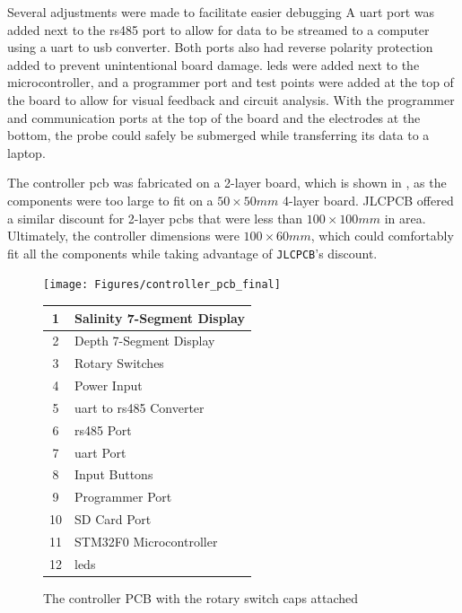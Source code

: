 Several adjustments were made to facilitate easier debugging
A \gls{uart} port was added next to the \gls{rs485} port to allow for data to be streamed to a computer using a \gls{uart} to \gls{usb} converter.
Both ports also had reverse polarity protection added to prevent unintentional board damage. 
\glspl{led} were added next to the microcontroller, and a programmer port and test points were added at the top of the board to allow for visual feedback and circuit analysis.
With the programmer and communication ports at the top of the board and the electrodes at the bottom, the probe could safely be submerged while transferring its data to a laptop.

The controller \gls{pcb} was fabricated on a 2-layer board, which is shown in , as the components were too large to fit on a $50\times 50mm$ 4-layer board.
JLCPCB offered a similar discount for 2-layer \glspl{pcb} that were less than $100\times 100mm$ in area.
Ultimately, the controller dimensions were $100\times 60mm$, which could comfortably fit all the components while taking advantage of \texttt{JLCPCB}'s discount.

\begin{figure}[ht]
    \begin{minipage}{0.5\textwidth}
        \centering
        \texttt{[image: Figures/controller\_pcb\_final]}
    \end{minipage}
        \begin{minipage}{0.5\textwidth}
            \centering
            \begin{tabular}{cl} \hline
            1 & Salinity 7-Segment Display \\ \hline
            2 & Depth 7-Segment Display \\ \hline
            3 & Rotary Switches \\ \hline
            4 & Power Input \\ \hline
            5 & \gls{uart} to \gls{rs485} Converter \\ \hline
            6 & \gls{rs485} Port \\ \hline
            7 & \gls{uart} Port \\ \hline
            8 & Input Buttons \\ \hline
            9 & Programmer Port \\ \hline
            10 & SD Card Port \\ \hline
            11 & STM32F0 Microcontroller \\ \hline
            12 & \glspl{led} \\ \hline
        \end{tabular}
    \end{minipage}
    \caption{The controller PCB with the rotary switch caps attached}
    \label{fig:controller-pcb} %
\end{figure}

